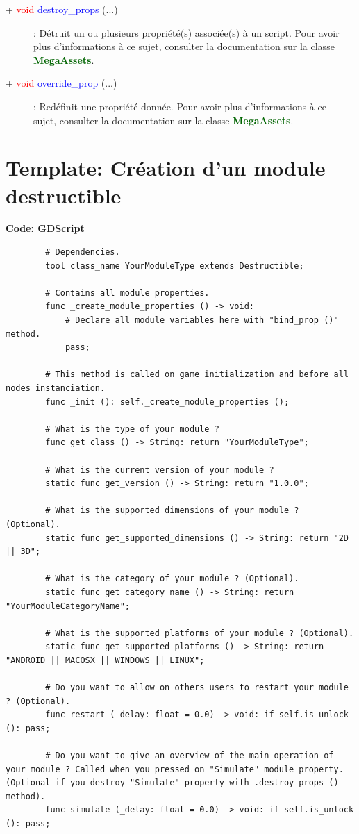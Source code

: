 \documentclass[a4paper, 11pt]{article}
\begin{document}
	\begin{description}
		\item [+ \textcolor{red}{void} \textcolor{blue}{destroy\_props} (...)]: Détruit un ou plusieurs
		propriété(s) associée(s) à un script. Pour avoir plus d'informations à ce sujet, consulter la
		documentation sur la classe \textbf{\textcolor{darkgreen}{MegaAssets}}.\\
	\end{description}
	\begin{description}
		\item [+ \textcolor{red}{void} \textcolor{blue}{override\_prop} (...)]: Redéfinit une propriété
		donnée. Pour avoir plus d'informations à ce \\sujet, consulter la documentation sur la classe
		\textbf{\textcolor{darkgreen}{MegaAssets}}.\\
	\end{description}

	\newpage \section{Template: Création d'un module destructible}
	\textbf{Code: GDScript}
	\begin{lstlisting}
		# Dependencies.
		tool class_name YourModuleType extends Destructible;

		# Contains all module properties.
		func _create_module_properties () -> void:
			# Declare all module variables here with "bind_prop ()" method.
			pass;

		# This method is called on game initialization and before all nodes instanciation.
		func _init (): self._create_module_properties ();

		# What is the type of your module ?
		func get_class () -> String: return "YourModuleType";

		# What is the current version of your module ?
		static func get_version () -> String: return "1.0.0";

		# What is the supported dimensions of your module ? (Optional).
		static func get_supported_dimensions () -> String: return "2D || 3D";

		# What is the category of your module ? (Optional).
		static func get_category_name () -> String: return "YourModuleCategoryName";
		
		# What is the supported platforms of your module ? (Optional).
		static func get_supported_platforms () -> String: return "ANDROID || MACOSX || WINDOWS || LINUX";

		# Do you want to allow on others users to restart your module ? (Optional).
		func restart (_delay: float = 0.0) -> void: if self.is_unlock (): pass;

		# Do you want to give an overview of the main operation of your module ? Called when you pressed on "Simulate" module property. (Optional if you destroy "Simulate" property with .destroy_props () method).
		func simulate (_delay: float = 0.0) -> void: if self.is_unlock (): pass;
	\end{lstlisting}
\end{document}
